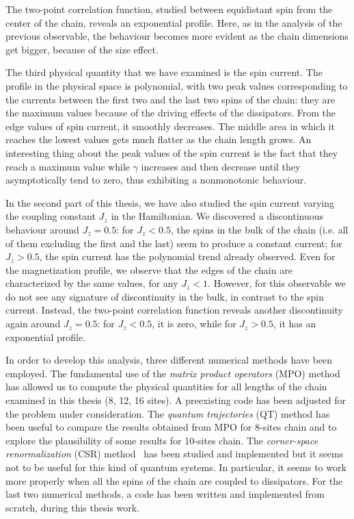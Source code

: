 \documentclass[12pt]{extarticle}
\begin{document}
The two-point correlation function, studied between equidistant spin from the center of the chain, reveals an exponential profile. Here, as in the analysis of the previous observable, the behaviour becomes more evident as the chain dimensions get bigger, because of the size effect.

The third physical quantity that we have examined is the spin current. The profile in the physical space is polynomial, with two peak values corresponding to the currents between the first two and the last two spins of the chain: they are the maximum values because of the driving effects of the dissipators. From the edge values of spin current, it smoothly decreases. The middle area in which it reaches the lowest values gets much flatter as the chain length grows. An interesting thing about the peak values of the spin current is the fact that they reach a maximum value while $\gamma$ increases and then decrease until they  asymptotically tend to zero, thus exhibiting a nonmonotonic behaviour.

In the second part of this thesis, we have also studied the spin current varying the coupling constant $J_z$ in the Hamiltonian. We discovered a discontinuous behaviour around $J_z = 0.5$: for $J_z < 0.5$, %
the spins in the bulk of the chain (i.e. all of them excluding the first and the last) seem to produce a constant current; for $J_z > 0.5$, the spin current has the polynomial trend already observed. Even for the magnetization profile, we observe that the edges of the chain are characterized by the same values, for any $J_z<1$. However, for this observable we do not see any signature of discontinuity in the bulk, in contrast to the spin current. Instead, the two-point correlation function reveals another discontinuity again around $J_z = 0.5$: for $J_z < 0.5$, it is zero, while for $J_z > 0.5$, it has an exponential profile.

In order to develop this analysis, three different numerical methods have been employed.  The fundamental use of the \emph{matrix product operators} (MPO) method\cite{mpo_method} has allowed us to compute the physical quantities for all lengths of the chain examined in this thesis (8, 12, 16 sites). A preexisting code has been adjusted for the problem under consideration. The \emph{quantum trajectories} (QT) method\cite{QT_method} has been useful to compare the results obtained from MPO for 8-sites chain and to explore the plausibility of some results for 10-sites chain. The \emph{corner-space renormalization} (CSR) method~\cite{CSR_method} has been studied and implemented but it seems not to be useful for this kind of quantum systems. In particular, it seems to work more properly when all the spins of the chain are coupled to dissipators. For the last two numerical methods, a code has been written and implemented from scratch, during this thesis work.
\end{document}
